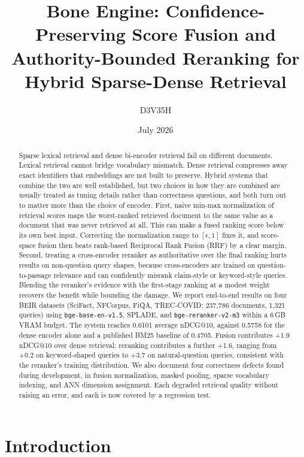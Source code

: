\documentclass[11pt]{article}
\title{\textbf{Bone Engine: Confidence-Preserving Score Fusion and Authority-Bounded Reranking for Hybrid Sparse-Dense Retrieval}}
\author[1]{D3V35H}
\affil[1]{Independent Research}
\date{July 2026}
\begin{document}
\maketitle

\begin{abstract}
Sparse lexical retrieval and dense bi-encoder retrieval fail on different documents. Lexical retrieval cannot bridge vocabulary mismatch. Dense retrieval compresses away exact identifiers that embeddings are not built to preserve. Hybrid systems that combine the two are well established, but two choices in how they are combined are usually treated as tuning details rather than correctness questions, and both turn out to matter more than the choice of encoder. First, naive min-max normalization of retrieval scores maps the worst-ranked retrieved document to the same value as a document that was never retrieved at all. This can make a fused ranking score below its own best input. Correcting the normalization range to $[\epsilon, 1]$ fixes it, and score-space fusion then beats rank-based Reciprocal Rank Fusion (RRF) by a clear margin. Second, treating a cross-encoder reranker as authoritative over the final ranking hurts results on non-question query shapes, because cross-encoders are trained on question-to-passage relevance and can confidently misrank claim-style or keyword-style queries. Blending the reranker's evidence with the first-stage ranking at a modest weight recovers the benefit while bounding the damage. We report end-to-end results on four BEIR datasets (SciFact, NFCorpus, FiQA, TREC-COVID: 237{,}786 documents, 1{,}321 queries) using \texttt{bge-base-en-v1.5}, SPLADE, and \texttt{bge-reranker-v2-m3} within a 6\,GB VRAM budget. The system reaches 0.6101 average nDCG@10, against 0.5758 for the dense encoder alone and a published BM25 baseline of 0.4705. Fusion contributes +1.9 nDCG@10 over dense retrieval; reranking contributes a further +1.6, ranging from +0.2 on keyword-shaped queries to +3.7 on natural-question queries, consistent with the reranker's training distribution. We also document four correctness defects found during development, in fusion normalization, masked pooling, sparse vocabulary indexing, and ANN dimension assignment. Each degraded retrieval quality without raising an error, and each is now covered by a regression test.
\end{abstract}

\section{Introduction}
\end{document}
